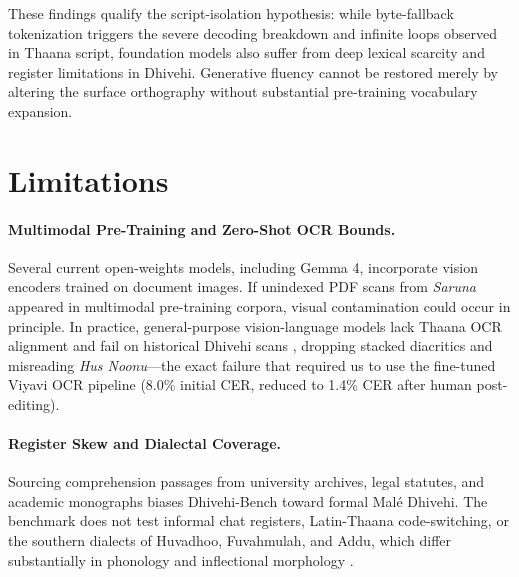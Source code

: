\documentclass[acmsmall,review,anonymous]{acmart}
\begin{document}
These findings qualify the script-isolation hypothesis: while byte-fallback tokenization triggers the severe decoding breakdown and infinite loops observed in Thaana script, foundation models also suffer from deep lexical scarcity and register limitations in Dhivehi. Generative fluency cannot be restored merely by altering the surface orthography without substantial pre-training vocabulary expansion.

\section{Limitations}
\label{sec:limitations}

\paragraph{Multimodal Pre-Training and Zero-Shot OCR Bounds.}
Several current open-weights models, including Gemma 4, incorporate vision encoders trained on document images. If unindexed PDF scans from \textit{Saruna} appeared in multimodal pre-training corpora, visual contamination could occur in principle. In practice, general-purpose vision-language models lack Thaana OCR alignment and fail on historical Dhivehi scans \cite{hameed_bridging_2026}, dropping stacked diacritics and misreading \textit{Hus Noonu}---the exact failure that required us to use the fine-tuned Viyavi OCR pipeline (8.0\% initial CER, reduced to 1.4\% CER after human post-editing).

\paragraph{Register Skew and Dialectal Coverage.}
Sourcing comprehension passages from university archives, legal statutes, and academic monographs biases Dhivehi-Bench toward formal Mal\'{e} Dhivehi. The benchmark does not test informal chat registers, Latin-Thaana code-switching, or the southern dialects of Huvadhoo, Fuvahmulah, and Addu, which differ substantially in phonology and inflectional morphology \cite{fritz_dhivehi_2002}.
\end{document}
